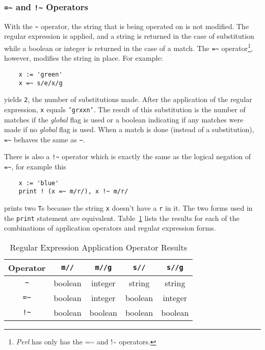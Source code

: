 \subsubsection{{\large\tt =\~{}} and {\large\tt !\~{}} Operators}

With the \verb+~+ operator, the string that is being operated on is not
modified. The regular expression is applied, and a string is returned in
the case of substitution while a boolean or integer is returned in the case
of a match. The \verb+=~+ operator\footnote{{\em Perl} has only has the =\~{} and
!\~{} operators.}, however, modifies the string in place.
For example:
\begin{verbatim}
    x := 'green'
    x =~ s/e/x/g
\end{verbatim}
yields {\tt 2}, the number of substitutions made. After the application of
the regular expression, {\tt x} equals {\tt 'grxxn'}. The result of this
substitution is the number of matches if the {\em global} flag is used or
a boolean indicating if any matches were made if no {\em global} flag is
used. When a match is done (instead of a substitution), \verb+=~+ behaves
the same as \verb+~+.

There is also a \verb+!~+ operator which is exactly the same as
the logical negation of \verb+=~+, for example this
\begin{verbatim}
    x := 'blue'
    print ! (x =~ m/r/), x !~ m/r/
\end{verbatim}
prints two {\tt T}s because the string {\tt x} doesn't have a {\tt r} in it.
The two forms used in the {\tt print} statement are equivalent.
Table~\ref{regex-appl-op} lists the results for each of the combinations of
application operators and regular expression forms.
\begin{table}[tbh]
\begin{center}
\begin{tabular}{|c||c|c|c|c|}
\hline
Operator & \verb+m//+ & \verb+m//g+ & \verb+s//+ & \verb+s//g+ \\
\hline
\hline
\verb-~-      & boolean & integer & string & string \\ \hline
\verb-=~-     & boolean & integer & boolean & integer \\ \hline
\verb-!~-     & boolean & boolean & boolean & boolean \\ \hline
\end{tabular}
\end{center}

\caption{Regular Expression Application Operator Results}
\label{regex-appl-op}
\end{table}

